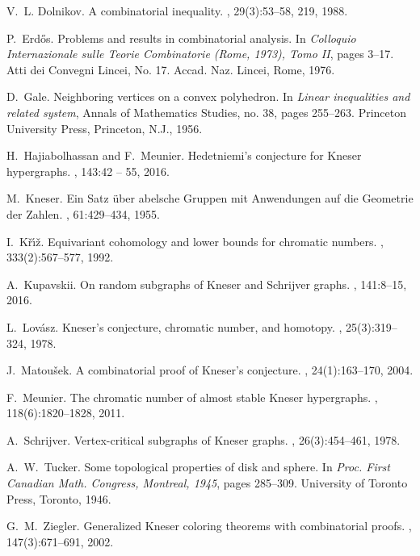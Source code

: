 \documentclass[11pt]{amsart}
\theoremstyle{definition}
\theoremstyle{remark}
\begin{document}
\begin{thebibliography}{10}
V.~L. Dol{\cprime}nikov.
\newblock A combinatorial inequality.
, 29(3):53--58, 219, 1988.

P.~Erd{\H{o}}s.
\newblock Problems and results in combinatorial analysis.
\newblock In {\em Colloquio {I}nternazionale sulle {T}eorie {C}ombinatorie
  ({R}ome, 1973), {T}omo {II}}, pages 3--17. Atti dei Convegni Lincei, No. 17.
  Accad. Naz. Lincei, Rome, 1976.

D.~Gale.
\newblock Neighboring vertices on a convex polyhedron.
\newblock In {\em Linear inequalities and related system}, Annals of
  Mathematics Studies, no. 38, pages 255--263. Princeton University Press,
  Princeton, N.J., 1956.

H.~{Hajiabolhassan} and F.~{Meunier}.
\newblock Hedetniemi's conjecture for {K}neser hypergraphs.
, 143:42 -- 55, 2016.

M.~Kneser.
\newblock Ein {S}atz \"uber abelsche {G}ruppen mit {A}nwendungen auf die
  {G}eometrie der {Z}ahlen.
, 61:429--434, 1955.

I.~K{\v{r}}{\'{\i}}{\v{z}}.
\newblock Equivariant cohomology and lower bounds for chromatic numbers.
, 333(2):567--577, 1992.

A.~Kupavskii.
\newblock On random subgraphs of {K}neser and {S}chrijver graphs.
, 141:8--15, 2016.

L.~Lov{\'a}sz.
\newblock Kneser's conjecture, chromatic number, and homotopy.
, 25(3):319--324, 1978.

J.~Matou{\v{s}}ek.
\newblock A combinatorial proof of {K}neser's conjecture.
, 24(1):163--170, 2004.

F.~Meunier.
\newblock The chromatic number of almost stable {K}neser hypergraphs.
, 118(6):1820--1828, 2011.

A.~Schrijver.
\newblock Vertex-critical subgraphs of {K}neser graphs.
, 26(3):454--461, 1978.

A.~W.~Tucker.
\newblock Some topological properties of disk and sphere.
\newblock In {\em Proc. {F}irst {C}anadian {M}ath. {C}ongress, {M}ontreal,
  1945}, pages 285--309. University of Toronto Press, Toronto, 1946.

G.~M.~Ziegler.
\newblock Generalized {K}neser coloring theorems with combinatorial proofs.
, 147(3):671--691, 2002.

\end{thebibliography}
%
%
\end{document}
